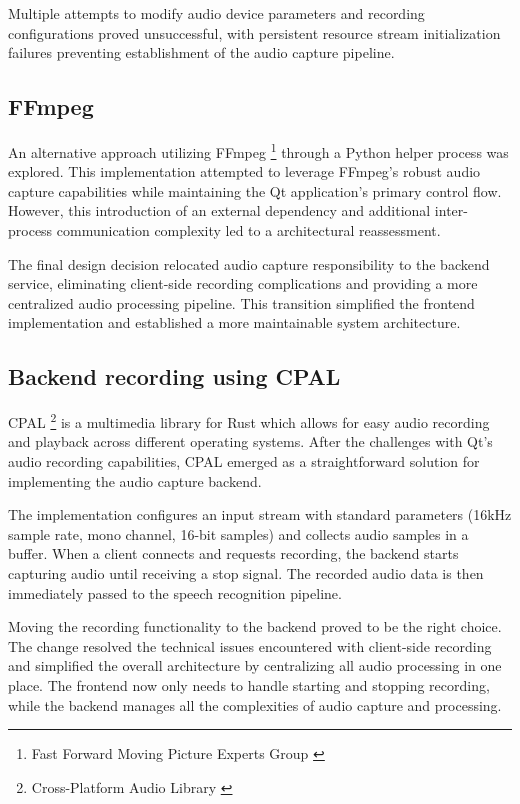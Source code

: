 Multiple attempts to modify audio device parameters
and recording configurations proved unsuccessful,
with persistent resource stream initialization failures
preventing establishment of the audio capture pipeline.

\subsection{FFmpeg}
An alternative approach utilizing FFmpeg \footnote{Fast Forward Moving Picture Experts Group \cite{ffmpeg}} through a Python helper process was explored.
This implementation attempted to leverage FFmpeg's robust audio capture capabilities
while maintaining the Qt application's primary control flow.
However, this introduction of an external dependency
and additional inter-process communication complexity
led to a architectural reassessment.

The final design decision relocated audio capture responsibility to the backend service,
eliminating client-side recording complications
and providing a more centralized audio processing pipeline.
This transition simplified the frontend implementation
and established a more maintainable system architecture.

\subsection{Backend recording using CPAL}
CPAL \footnote{Cross-Platform Audio Library \cite{cpal}} is a multimedia library for Rust
which allows for easy audio recording and playback across different operating systems.
After the challenges with Qt's audio recording capabilities,
CPAL emerged as a straightforward solution for implementing the audio capture backend.

The implementation configures an input stream with standard parameters
(16kHz sample rate, mono channel, 16-bit samples) and collects audio samples
in a buffer. When a client connects and requests recording, the backend
starts capturing audio until receiving a stop signal. The recorded audio
data is then immediately passed to the speech recognition pipeline.

Moving the recording functionality to the backend proved to be the right choice.
The change resolved the technical issues encountered with client-side recording
and simplified the overall architecture by centralizing all audio processing
in one place. The frontend now only needs to handle starting and stopping recording,
while the backend manages all the complexities of audio capture and processing.


